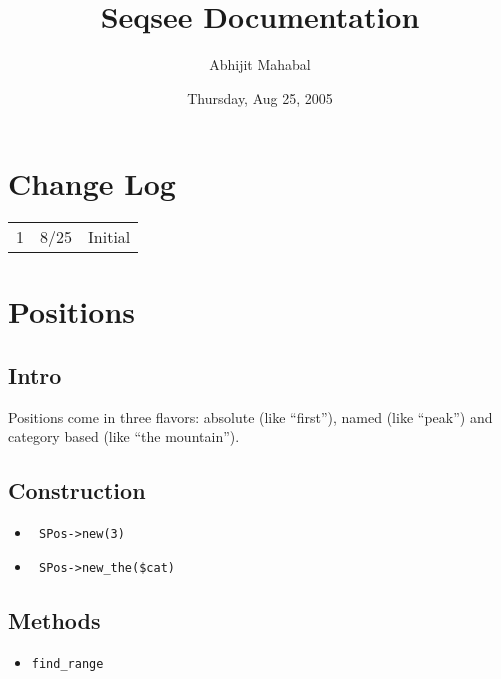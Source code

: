 \documentclass{article}
\begin{document}
\title{Seqsee Documentation}
\date{Thursday, Aug 25, 2005}
\author{Abhijit Mahabal}
\maketitle

\section*{Change Log}

\begin{tabular}{llp{3in}}
  1 & 8/25 & Initial\\
  
\end{tabular}

\section*{Positions}

\subsection*{Intro}
Positions come in three flavors: absolute (like ``first''), named (like ``peak'') and category based (like ``the mountain''). 

\subsection*{Construction}

\begin{itemize}
\item \verb# SPos->new(3)#
\item \verb# SPos->new_the($cat)#
\end{itemize}

\subsection*{Methods}

\begin{itemize}
\item \verb!find_range!
\end{itemize}
\end{document}
